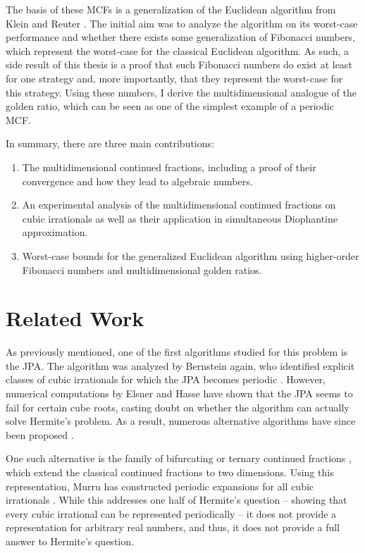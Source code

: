 The basis of these MCFs is a generalization of the Euclidean algorithm from
Klein and Reuter \cite{Klein24}.
The initial aim was to analyze the algorithm on its worst-case performance
and whether there exists some generalization of Fibonacci numbers,
which represent the worst-case for the classical Euclidean algorithm.
As such, a side result of this thesis is a proof that such Fibonacci numbers do
exist at least for one strategy and, more importantly, that they represent the
worst-case for this strategy.
Using these numbers, I derive the multidimensional analogue of the golden
ratio, which can be seen as one of the simplest example of a periodic MCF.

In summary, there are three main contributions:
\begin{enumerate}
  \item The multidimensional continued fractions,
    including a proof of their convergence and
    how they lead to algebraic numbers.
  \item An experimental analysis of the multidimensional continued fractions
    on cubic irrationals as well as their application in simultaneous
    Diophantine approximation.
  \item Worst-case bounds for the generalized Euclidean algorithm
    using higher-order Fibonacci numbers and multidimensional golden ratios.
\end{enumerate}

\section{Related Work}
\label{sec:related-work}

As previously mentioned,
one of the first algorithms studied for this problem is the JPA.
The algorithm was analyzed by Bernstein \cite{Bernstein71} again,
who identified explicit classes of cubic irrationals for which the JPA
becomes periodic \cite{Bernstein64A, Bernstein65, Bernstein64B}.
However, numerical computations by Elsner and Hasse \cite{Elsner67} have shown
that the JPA seems to fail for certain cube roots,
casting doubt on whether the algorithm can actually solve Hermite’s problem.
As a result, numerous alternative algorithms have since been proposed
\cite{Assaf05, Hendy81, Schweiger00, Schweiger13}.

One such alternative is the family of bifurcating or ternary continued
fractions \cite{Gupta00},
which extend the classical continued fractions to two dimensions.
Using this representation, Murru has constructed periodic expansions for all
cubic irrationals \cite{Murru15}.
While this addresses one half of Hermite’s question --
showing that every cubic irrational can be represented periodically --
it does not provide a representation for arbitrary real numbers,
and thus, it does not provide a full answer to Hermite's question.

